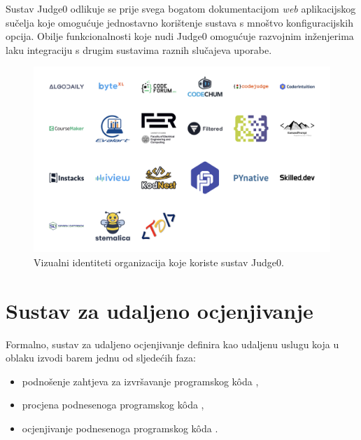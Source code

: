 \documentclass[times, utf8, diplomski]{fer}
\begin{document}
Sustav Judge0 odlikuje se prije svega bogatom dokumentacijom \textit{web} aplikacijskog sučelja koje omogućuje jednostavno korištenje sustava s mnoštvo konfiguracijskih opcija. Obilje funkcionalnosti koje nudi Judge0 omogućuje razvojnim inženjerima laku integraciju s drugim sustavima raznih slučajeva uporabe.

\begin{figure}[htb]
	\centering
	\includegraphics[width=\textwidth]{images/Judge0 Clients.png}
	\caption{
	    Vizualni identiteti organizacija koje koriste sustav Judge0. \citep{Judge0Web}
	}
	\label{fig:judge0-clients}
\end{figure}

\pagebreak

\section{Sustav za udaljeno ocjenjivanje}
Formalno, sustav za udaljeno ocjenjivanje \citep{wasik2018survey} definira kao udaljenu uslugu  koja u oblaku  izvodi barem jednu od sljedećih faza:
\begin{itemize}
    \item podnošenje zahtjeva za izvršavanje programskog kôda ,
    \item procjena podnesenoga programskog kôda ,
    \item ocjenjivanje podnesenoga programskog kôda .
\end{itemize}
\end{document}
